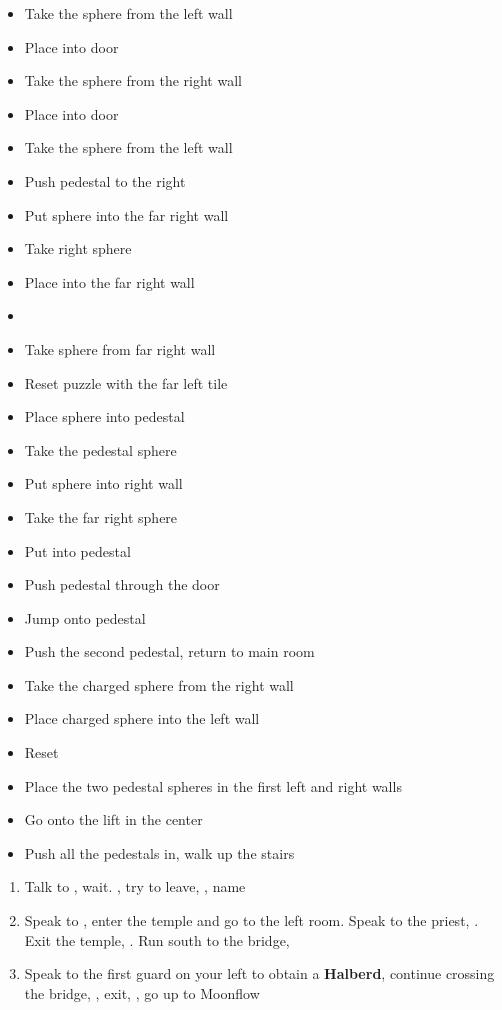 \begin{trial}
    \begin{itemize}
        \item Take the sphere from the left wall
        \item Place into door
        \item Take the sphere from the right wall
        \item Place into door
        \item Take the sphere from the left wall
        \item Push pedestal to the right
        \item Put sphere into the far right wall
        \item Take right sphere
        \item Place into the far right wall
        \item \cs
        \item Take sphere from far right wall
        \item Reset puzzle with the far left tile
        \item Place sphere into pedestal
        \item Take the pedestal sphere
        \item Put sphere into right wall
        \item Take the far right sphere
        \item Put into pedestal
        \item Push pedestal through the door
        \item Jump onto pedestal
        \item Push the second pedestal, return to main room
        \item Take the charged sphere from the right wall
        \item Place charged sphere into the left wall
        \item Reset
        \item Place the two pedestal spheres in the first left and right walls
        \item Go onto the lift in the center
        \item Push all the pedestals in, walk up the stairs
    \end{itemize}
\end{trial}
\begin{enumerate}[resume]
    \item Talk to \auron, wait. \sd, try to leave, \sd, name \ixion
    \item Speak to \auron, enter the temple and go to the left room. Speak to the priest, \sd. Exit the temple, \sd. Run south to the bridge, \sd
    \item Speak to the first guard on your left to obtain a \textbf{Halberd}, continue crossing the bridge, \sd, exit, \sd, go up to Moonflow
\end{enumerate}
